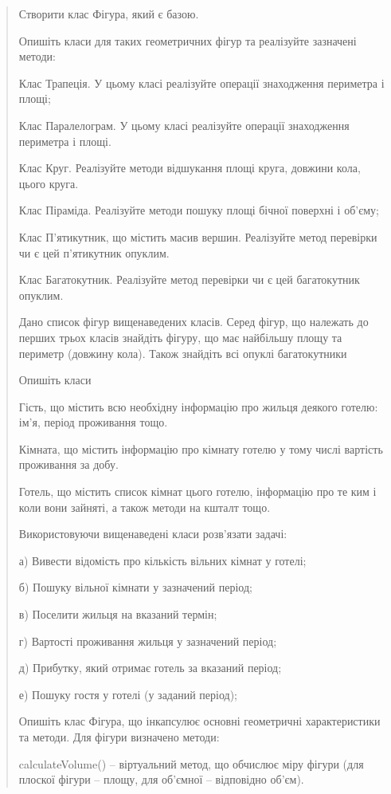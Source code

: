 \documentclass[]{article}
\begin{document}
\begin{quote}
Створити клас Фігура, який є базою.

Опишіть класи для таких геометричних фігур та реалізуйте зазначені
методи:

Клас Трапеція. У цьому класі реалізуйте операції знаходження периметра і
площі;

Клас Паралелограм. У цьому класі реалізуйте операції знаходження
периметра і площі.

Клас Круг. Реалізуйте методи відшукання площі круга, довжини кола, цього
круга.

Клас Піраміда. Реалізуйте методи пошуку площі бічної поверхні і об'єму;

Клас П'ятикутник, що містить масив вершин. Реалізуйте метод перевірки чи
є цей п'ятикутник опуклим.

Клас Багатокутник. Реалізуйте метод перевірки чи є цей багатокутник
опуклим.

Дано список фігур вищенаведених класів. Серед фігур, що належать до
перших трьох класів знайдіть фігуру, що має найбільшу площу та периметр
(довжину кола). Також знайдіть всі опуклі багатокутники

Опишіть класи

Гість, що містить всю необхідну інформацію про жильця деякого готелю:
ім'я, період проживання тощо.

Кімната, що містить інформацію про кімнату готелю у тому числі вартість
проживання за добу.

Готель, що містить список кімнат цього готелю, інформацію про те ким і
коли вони зайняті, а також методи на кшталт тощо.

Використовуючи вищенаведені класи розв'язати задачі:

а) Вивести відомість про кількість вільних кімнат у готелі;

б) Пошуку вільної кімнати у зазначений період;

в) Поселити жильця на вказаний термін;

г) Вартості проживання жильця у зазначений період;

д) Прибутку, який отримає готель за вказаний період;

е) Пошуку гостя у готелі (у заданий період);

Опишіть клас Фігура, що інкапсулює основні геометричні характеристики та
методи. Для фігури визначено методи:

calculateVolume() -- віртуальний метод, що обчислює міру фігури (для
плоскої фігури -- площу, для об'ємної -- відповідно об'єм).


\end{quote}
\end{document}
